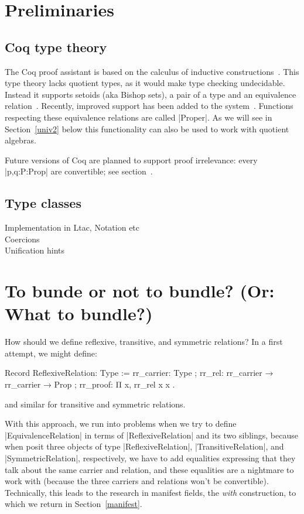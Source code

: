 \documentclass[a4paper,10pt, runningheads]{llncs}
\begin{document}
\section{Preliminaries}
\subsection{Coq type theory}
The Coq proof assistant is based on the calculus of inductive
constructions~\cite{CoquandHuet,CoquandPaulin}.
This type theory lacks quotient types, as it would make type checking undecidable. Instead it
supports setoids (aka Bishop sets), a pair of a type and an equivalence
relation~\cite{Bishop67,Hofmann,Capretta}. Recently, improved support has been added to the
system~\cite{Setoid-rewrite}. Functions respecting these equivalence relations are called |Proper|.
As we will see in Section~\ref{univ2} below this functionality can also be used to work with
quotient algebras.

Future versions of Coq are planned to support proof irrelevance: every |p,q:P:Prop| are
convertible; see section~\cite{explit}.

\subsection{Type classes}
Implementation in Ltac, Notation etc\\
Coercions\\
Unification hints

\section{To bunde or not to bundle? (Or: What to bundle?)}

How should we define reflexive, transitive, and symmetric relations? In a first attempt, we
might define:
\begin{code}
  Record ReflexiveRelation: Type :=
    { rr_carrier: Type
    ; rr_rel: rr_carrier → rr_carrier → Prop
    ; rr_proof: Π x, rr_rel x x }.
\end{code}
and similar for transitive and symmetric relations.

With this approach, we run into problems when we try to define |EquivalenceRelation| in terms of
|ReflexiveRelation| and its two siblings, because when posit three objects of type
|ReflexiveRelation|, |TransitiveRelation|, and |SymmetricRelation|, respectively, we have to
add equalities expressing that they talk about the same carrier and relation, and these equalities
are a nightmare to work with (because the three carriers and relations won't be convertible).
Technically, this leads to the research in manifest fields, the \emph{with} construction, to which
we return in Section~\ref{manifest}.
\end{document}
